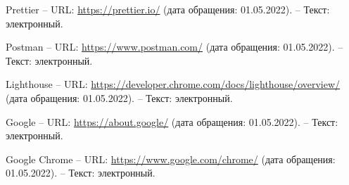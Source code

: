 \begin{thebibliography}{00}
        Prettier
        --
        URL:
        \href{https://prettier.io/}{https://prettier.io/}
        (дата обращения: 01.05.2022).
        --
        Текст: электронный.

        Postman
        --
        URL:
        \href{https://www.postman.com/}{https://www.postman.com/}
        (дата обращения: 01.05.2022).
        --
        Текст: электронный.

        Lighthouse
        --
        URL:
        \href{https://developer.chrome.com/docs/lighthouse/overview/}{https://developer.chrome.com/docs/lighthouse/overview/}
        (дата обращения: 01.05.2022).
        --
        Текст: электронный.

        Google
        --
        URL:
        \href{https://about.google/}{https://about.google/}
        (дата обращения: 01.05.2022).
        --
        Текст: электронный.

        Google Chrome
        --
        URL:
        \href{https://www.google.com/chrome/}{https://www.google.com/chrome/}
        (дата обращения: 01.05.2022).
        --
        Текст: электронный.

        

\begin{comment}

    \bibitem{livejournal}
        Главное - ЖЖ
        [Электронный ресурс] //
        LiveJournal — сервис для ведения блога и развития сообщества
        --
        Режим доступа:
        \href{https://www.livejournal.com/}{https://www.livejournal.com/}
        
    \bibitem{kickstarter}
        Kickstarter
        [Электронный ресурс] //
        Kickstarter - краудфандинговая платформа.
        --
        Режим доступа:
        \href{https://www.kickstarter.com/}{https://www.kickstarter.com/}

    \bibitem{ozon}
        OZON — интернет-магазин. Миллионы товаров по выгодным ценам
        [Электронный ресурс] //
        OZON. Интернет магазин
        --
        Режим доступа:
        \href{https://www.ozon.ru/}{https://www.ozon.ru/}

    \bibitem{stepik}
        Stepik
        [Электронный ресурс] //
        Stepik - интернет платформа для создания и распространения обучающего контента
        --
        Режим доступа:
        \href{https://stepik.org}{https://stepik.org/}


\end{comment}
\end{thebibliography}
